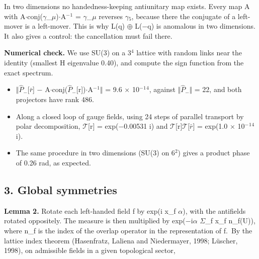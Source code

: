 \documentclass[
  11pt,
]{article}
\providecommand{\tightlist}{%
  \setlength{\itemsep}{0pt}\setlength{\parskip}{0pt}}
\begin{document}
In two dimensions no handedness-keeping antiunitary map exists. Every map A with A\ensuremath{\cdot}conj(\ensuremath{\gamma}\_\ensuremath{\mu})\ensuremath{\cdot}A\ensuremath{^{-}}\ensuremath{^{1}} = \ensuremath{\gamma}\_\ensuremath{\mu} reverses \ensuremath{\gamma}\ensuremath{_{5}}, because there the conjugate of a left-mover is a left-mover. This is why L(q) \ensuremath{\oplus} L(\ensuremath{-}q) is anomalous in two dimensions. It also gives a control: the cancellation must fail there.

\textbf{Numerical check.} We use SU(3) on a 3\ensuremath{^{4}} lattice with random links near the identity (smallest \textbar H\textbar{} eigenvalue 0.40), and compute the sign function from the exact spectrum.

\begin{itemize}
\tightlist
\item
  \ensuremath{\Vert}\ensuremath{\hat{P}}\ensuremath{_{-}}{[}\ensuremath{\bar{r}}{]} \ensuremath{-} A\ensuremath{\cdot}conj(\ensuremath{\hat{P}}\ensuremath{_{-}}{[}r{]})\ensuremath{\cdot}A\ensuremath{^{-}}\ensuremath{^{1}}\ensuremath{\Vert} = 9.6 \ensuremath{\times} 10\ensuremath{^{-}}\ensuremath{^{1}}\ensuremath{^{4}}, against \ensuremath{\Vert}\ensuremath{\hat{P}}\ensuremath{_{-}}\ensuremath{\Vert} = 22, and both projectors have rank 486.
\item
  Along a closed loop of gauge fields, using 24 steps of parallel transport by polar decomposition, \ensuremath{\mathcal{T}}{[}r{]} = exp(\ensuremath{-}0.00531 i) and \ensuremath{\mathcal{T}}{[}r{]}\ensuremath{\mathcal{T}}{[}\ensuremath{\bar{r}}{]} = exp(1.0 \ensuremath{\times} 10\ensuremath{^{-}}\ensuremath{^{1}}\ensuremath{^{4}} i).
\item
  The same procedure in two dimensions (SU(3) on 6\ensuremath{^{2}}) gives a product phase of 0.26 rad, as expected.
\end{itemize}

\hypertarget{global-symmetries}{%
\subsection{3. Global symmetries}\label{global-symmetries}}

\textbf{Lemma 2.} Rotate each left-handed field f by exp(i x\_f \ensuremath{\alpha}), with the antifields rotated oppositely. The measure is then multiplied by exp(\ensuremath{-}i\ensuremath{\alpha} \ensuremath{\Sigma}\_f x\_f n\_f(U)), where n\_f is the index of the overlap operator in the representation of f.~By the lattice index theorem (Hasenfratz, Laliena and Niedermayer, 1998; Lüscher, 1998), on admissible fields in a given topological sector,
\end{document}
